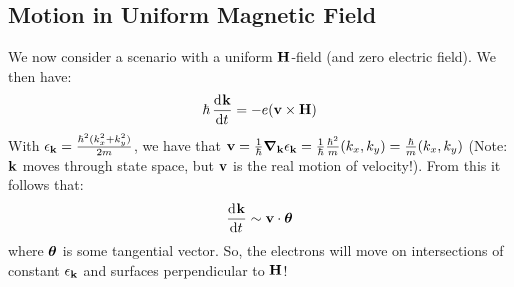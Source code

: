 \subsection{Motion in Uniform Magnetic Field}
We now consider a scenario with a uniform $\mathbf{H}$-field (and zero electric field). We then have:
\begin{equation}
    \hbar\dod{\v{k}}{t} = -e(\v{v} \times \v{H})
\end{equation}
With $\epsilon_{\mathbf{k}} = \frac{\hbar^2(k_x^2 + k_y^2)}{2m}$, we have that $\v{v} = \frac{1}{\hbar}\nabla_{\v{k}} \e_{\v{k}} = \frac{1}{\hbar}\frac{\hbar^2}{m}(k_x, k_y) = \frac{\hbar}{m}(k_x, k_y)$ (Note: $\mathbf{k}$ moves through state space, but $\mathbf{v}$ is the real motion of velocity!). From this it follows that:
\begin{equation}
    \dod{\v{k}}{t} \sim \v{v} \cdot \gv{\theta}
\end{equation}
where $\mbox{\boldmath$ \theta $}$ is some tangential vector.  So, the electrons will move on intersections of constant $\epsilon_{\mathbf{k}}$ and surfaces perpendicular to $\mathbf{H}$!